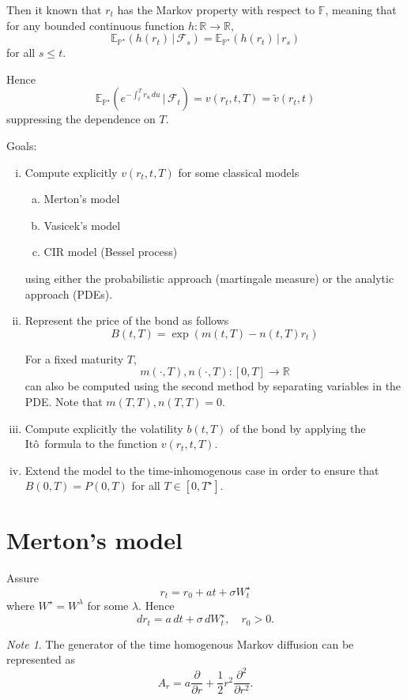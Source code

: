 \documentclass[10pt, oneside, reqno]{amsbook}
\theoremstyle{plain}%
\theoremstyle{definition}
\theoremstyle{remark}
\newtheorem*{note}{Note}
\newcommand{\given}{ \, | \,}
\newcommand{\sigf}{\mathcal{F}}
\newcommand{\R}{\mathbb{R}}
\newcommand{\E}{\mathbb{E}}
\renewcommand{\P}{\mathbb{P}}
\newcommand{\F}{\mathbb{F}}
\newcommand{\ito}{It\^o\ }
\numberwithin{equation}{chapter}
\begin{document}
    Then it known that $r_t$ has the Markov property with respect to $\F$, meaning that for any bounded continuous function $h : \R \rightarrow \R$, \[
    \E_{\P^\star} \left(h(r_t) \given \sigf_s \right) = \E_{\P^\star}\left(h(r_t) \given r_s \right)
 \] for all $s \leq t$.   

Hence \[
    \E_{\P^\star} \left(e^{-\int_t^T r_u \, du} \given \sigf_t \right) = v(r_t, t, T) = \tilde v(r_t, t) 
\] suppressing the dependence on $T$.

Goals:
\begin{enumerate}[(i)]
    \item Compute explicitly $v(r_t, t, T)$ for some classical models \begin{enumerate}[(a)]
        \item Merton's model 
        \item Vasicek's model
        \item CIR model (Bessel process)
    \end{enumerate}
    using either the probabilistic approach (martingale measure) or the  analytic approach (PDEs).
    \item Represent the price of the bond as follows \[
        B(t, T) = \exp \left( m(t, T) - n(t, T) r_t \right)
    \]
    
    For a fixed maturity $T$, \[
        m(\cdot, T), n(\cdot, T) : [0, T] \rightarrow \R
    \] can also be computed using the second method by separating variables in the PDE.  Note that $m(T, T), n(T, T) = 0$.
    \item Compute explicitly the volatility $b(t, T)$ of the bond by applying the \ito formula to the function $v(r_t, t, T)$.
    \item Extend the model to the time-inhomogenous case in order to ensure that $B(0, T) = P(0, T)$ for all $T \in [0, T^\star]$.
\end{enumerate}

\section{Merton's model} %
\label{sub:merton_s_model}
    Assure \[
        r_t = r_0 + at + \sigma W_t^\star 
    \] where $W^\star = W^\lambda$ for some $\lambda$.  Hence
    \begin{equation}
        dr_t = a \, dt + \sigma \, dW^\star_t, \quad r_0 > 0.
    \end{equation} 
    \begin{note}
        The generator of the time homogenous Markov diffusion can be represented as \[
            A_r = a \frac{\partial }{\partial r} + \frac{1}{2} r^2 \frac{\partial^2}{\partial r^2}.  
        \]
    \end{note}
\end{document}
